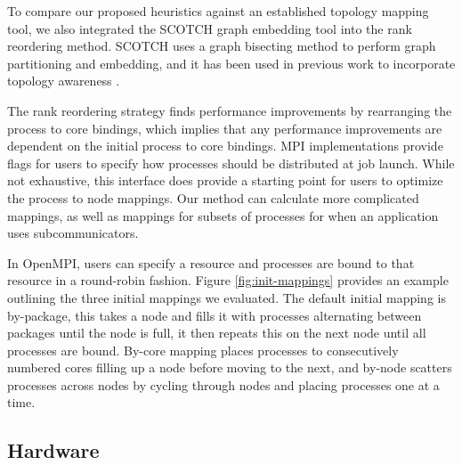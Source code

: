 To compare our proposed heuristics against an established topology mapping tool, we also integrated the SCOTCH graph embedding tool \cite{Pellegrini2012SCOTCH} into the rank reordering method.
SCOTCH uses a graph bisecting method to perform graph partitioning and embedding, and it has been used in previous work to incorporate topology awareness \cite{Mirsadeghi2016TopoAwareCollRR}.

The rank reordering strategy finds performance improvements by rearranging the process to core bindings, which implies that any performance improvements are dependent on the initial process to core bindings.
MPI implementations provide flags for users to specify how processes should be distributed at job launch. 
While not exhaustive, this interface does provide a starting point for users to optimize the process to node mappings.
Our method can calculate more complicated mappings, as well as mappings for subsets of processes for when an application uses subcommunicators.  

In OpenMPI, users can specify a resource and processes are bound to that resource in a round-robin fashion.
Figure \ref{fig:init-mappings} provides an example outlining the three initial mappings we evaluated.
The default initial mapping is by-package, this takes a node and fills it with processes alternating between packages until the node is full, it then repeats this on the next node until all processes are bound.
By-core mapping places processes to consecutively numbered cores filling up a node before moving to the next, and by-node scatters processes across nodes by cycling through nodes and placing processes one at a time.



\subsection{Hardware}\label{sec:topo-eval-hardware}

